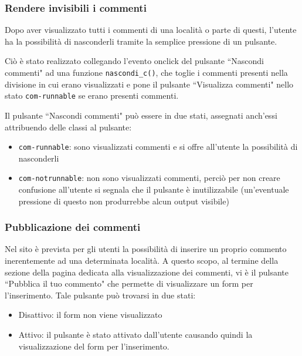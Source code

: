 \subsubsection{Rendere invisibili i commenti}
Dopo aver visualizzato tutti i commenti di una località o parte di questi,
l'utente ha la possibilità di nasconderli tramite la semplice pressione di un
pulsante.

Ciò è stato realizzato collegando l'evento onclick del pulsante
``Nascondi commenti" ad una funzione \texttt{nascondi\_c()}, che toglie i
commenti presenti nella divisione in cui erano visualizzati e pone il pulsante
``Visualizza commenti" nello stato \texttt{com-runnable} se erano presenti
commenti.

Il pulsante ``Nascondi commenti" può essere in due stati, assegnati anch'essi
attribuendo delle classi al pulsante:
\begin{itemize}
\item \texttt{com-runnable}: sono visualizzati commenti e si offre all'utente
la possibilità di nasconderli
\item \texttt{com-notrunnable}: non sono visualizzati commenti, perciò per non
creare confusione all'utente si segnala che il pulsante è inutilizzabile
(un'eventuale pressione di questo non produrrebbe alcun output visibile)
\end{itemize}


\subsubsection{Pubblicazione dei commenti}
Nel sito è prevista per gli utenti la possibilità di inserire un proprio commento
inerentemente ad una determinata località. A questo scopo, al termine della sezione 
della pagina dedicata alla visualizzazione dei commenti, vi è il pulsante 
``Pubblica il tuo commento" che permette di visualizzare un form per l'inserimento. 
Tale pulsante può trovarsi in due stati:
\begin{itemize}
\item Disattivo: il form non viene visualizzato
\item Attivo: il pulsante è stato attivato dall'utente causando
quindi la visualizzazione del form per l'inserimento.
\end{itemize}

